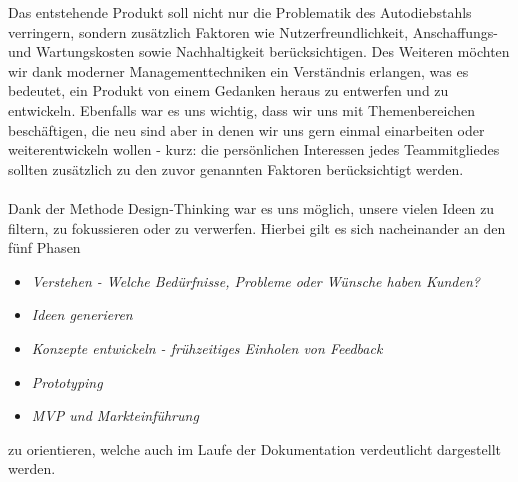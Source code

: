 Das entstehende Produkt soll nicht nur die Problematik des Autodiebstahls verringern, sondern zusätzlich Faktoren wie Nutzerfreundlichkeit, Anschaffungs- und Wartungskosten sowie Nachhaltigkeit berücksichtigen. Des Weiteren möchten wir dank moderner Managementtechniken ein Verständnis erlangen, was es bedeutet, ein Produkt von einem Gedanken heraus zu entwerfen und zu entwickeln. Ebenfalls war es uns wichtig, dass wir uns mit Themenbereichen beschäftigen, die neu sind aber in denen wir uns gern einmal einarbeiten oder weiterentwickeln wollen - kurz: die persönlichen Interessen jedes Teammitgliedes sollten zusätzlich zu den zuvor genannten Faktoren berücksichtigt werden.
\\
\\
Dank der Methode Design-Thinking war es uns möglich, unsere vielen Ideen zu filtern, zu fokussieren oder zu verwerfen. Hierbei gilt es sich nacheinander an den fünf Phasen
\begin{itemize}
	\item \textit{Verstehen - Welche Bedürfnisse, Probleme oder Wünsche haben Kunden?}
	\item \textit{Ideen generieren }
	\item \textit{Konzepte entwickeln - frühzeitiges Einholen von Feedback}
	\item \textit{Prototyping}
	\item \textit{MVP und Markteinführung}
\end{itemize}
zu orientieren, welche auch im Laufe der Dokumentation verdeutlicht dargestellt werden. \cite{Full2022}





